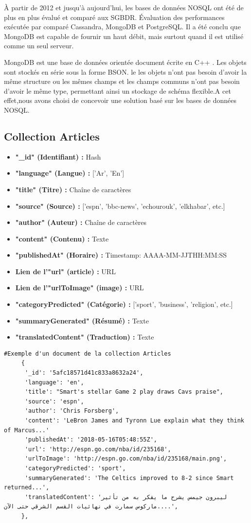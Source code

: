 À partir de 2012 et jusqu'à aujourd'hui, les bases de données NOSQL ont été de plus en plus évalué et comparé aux SGBDR. Évaluation des performances exécutée par \cite{NOSQL2} comparé Cassandra, MongoDB et PostgreSQL. Il a été conclu que MongoDB est capable de fournir un haut débit, mais surtout quand il est utilisé comme un seul serveur.

MongoDB est une base de données orientée document écrite en C++ \cite{NOSQL3}. Les objets sont stockés en série sous la forme BSON. le
les objets n'ont pas besoin d'avoir la même structure ou les mêmes champs et les champs communs n'ont pas besoin d'avoir le même type,
permettant ainsi un stockage de schéma flexible.A cet effet,nous avons choisi de concevoir une solution basé sur les bases de données NOSQL.

\subsection{Collection Articles}
   \begin{itemize}
     \item \textbf{"\_id" (Identifiant) :} Hash  
     \item \textbf{"language" (Langue) :} ['Ar', 'En']
     \item \textbf{"title" (Titre) :} Chaîne de caractères
     \item \textbf{"source" (Source) :} ['espn', 'bbc-news', 'echourouk', 'elkhabar', etc.]
     \item \textbf{"author" (Auteur) :} Chaîne de caractères
     \item \textbf{"content" (Contenu) :} Texte
     \item \textbf{"publishedAt" (Horaire) :} Timestamp: AAAA-MM-JJTHH:MM:SS
     \item \textbf{Lien de l'"url" (article) :} URL
     \item \textbf{Lien de l'"urlToImage" (image) :} URL 
     \item \textbf{"categoryPredicted" (Catégorie) :} ['sport', 'business', 'religion', etc.]
     \item \textbf{"summaryGenerated" (Résumé) :} Texte
     \item \textbf{"translatedContent" (Traduction) :} Texte
    \end{itemize}

     \begin{lstlisting}[style=code]
      #Exemple d'un document de la collection Articles 
     {
      '_id': '5afc18571d41c833a8632a24', 
      'language': 'en',
      'title': "Smart's stellar Game 2 play draws Cavs praise", 
      'source': 'espn', 
      'author': 'Chris Forsberg', 
      'content': 'LeBron James and Tyronn Lue explain what they think of Marcus...'
      'publishedAt': '2018-05-16T05:48:55Z', 
      'url': 'http://espn.go.com/nba/id/235168',
      'urlToImage': 'http://espn.go.com/nba/id/235168/main.png',  
      'categoryPredicted': 'sport', 
      'summaryGenerated': 'The Celtics improved to 8-2 since Smart returned...', 
      'translatedContent': 'ليبرون جيمس يشرح ما يفكر به من تأثير ماركوس سمارت في نهائيات القسم الشرقي حتى الآن....', 
     },
     \end{lstlisting}


